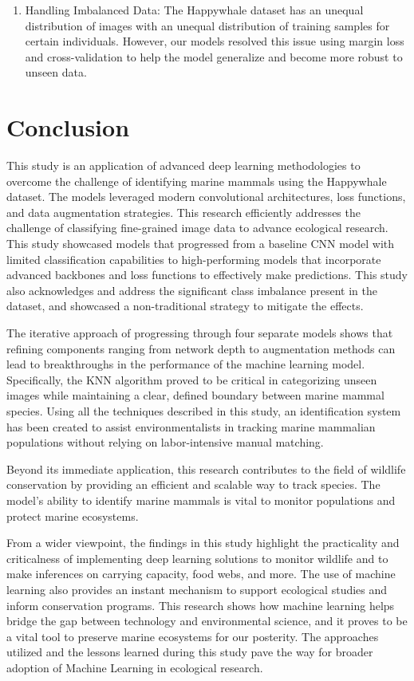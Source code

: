 \documentclass[twocolumn]{article}
\begin{document}
\begin{enumerate}
    \item Handling Imbalanced Data: The Happywhale dataset has an unequal distribution of images with an unequal distribution of training samples for certain individuals. However, our models resolved this issue using margin loss and cross-validation to help the model generalize and become more robust to unseen data.
\end{enumerate}

\section{Conclusion}

This study is an application of advanced deep learning methodologies to overcome the challenge of identifying marine mammals using the Happywhale dataset. The models leveraged modern convolutional architectures, loss functions, and data augmentation strategies. This research efficiently addresses the challenge of classifying fine-grained image data to advance ecological research. This study showcased models that progressed from a baseline CNN model with limited classification capabilities to high-performing models that incorporate advanced backbones and loss functions to effectively make predictions. This study also acknowledges and address the significant class imbalance present in the dataset, and showcased a non-traditional strategy to mitigate the effects.  

The iterative approach of progressing through four separate models shows that refining components ranging from network depth to augmentation methods can lead to breakthroughs in the performance of the machine learning model. Specifically, the KNN algorithm proved to be critical in categorizing unseen images while maintaining a clear, defined boundary between marine mammal species. Using all the techniques described in this study, an identification system has been created to assist environmentalists in tracking marine mammalian populations without relying on labor-intensive manual matching.

Beyond its immediate application, this research contributes to the field of wildlife conservation by providing an efficient and scalable way to track species. The model's ability to identify marine mammals is vital to monitor populations and protect marine ecosystems.

From a wider viewpoint, the findings in this study highlight the practicality and criticalness of implementing deep learning solutions to monitor wildlife and to make inferences on carrying capacity, food webs, and more. The use of machine learning also provides an instant mechanism to support ecological studies and inform conservation programs. This research shows how machine learning helps bridge the gap between technology and environmental science, and it proves to be a vital tool to preserve marine ecosystems for our posterity. The approaches utilized and the lessons learned during this study pave the way for broader adoption of Machine Learning in ecological research. 
\end{document}
